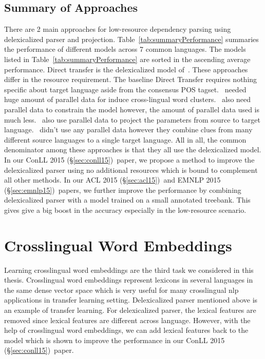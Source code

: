 \documentclass[12pt,twoside,final,hidelinks]{ltthesis}
\theoremstyle{definition}
\newcommand\conllv{ConLL 2015 (\S\ref{sec:conll15})}
\newcommand\aclv{ACL 2015 (\S\ref{sec:acl15})}
\newcommand\emnlpv{EMNLP 2015 (\S\ref{sec:emnlp15})}
\begin{document}
\subsection{Summary of Approaches}
There are 2 main approaches for low-resource dependency parsing using delexicalized parser and projection. Table~\ref{tab:summaryPerformance} summaries the performance of different models across 7 common languages. The models listed in Table~\ref{tab:summaryPerformance} are sorted in the ascending average performance. Direct transfer is the delexicalized model of~. These approaches differ in the resource requirement. The baseline Direct Transfer requires nothing specific about target language aside from the consensus POS tagset.~ needed huge amount of parallel data for induce cross-lingual word clusters.~ also need parallel data to constrain the model however, the amount of parallel data used is much less.~ also use parallel data to project the parameters from source to target language.~ didn't use any parallel data however they combine clues from many different source languages to a single target language. All in all, the common denominator among these approaches is that they all use the delexicalized model. In our \conllv\ paper, we propose a method to improve the delexicalized parser using no additional resources which is bound to complement all other methods. In our \aclv\ and \emnlpv\ papers, we further improve the performance by combining delexicalized parser with a model trained on a small annotated treebank. This gives give a big boost in the accuracy especially in the low-resource scenario. 


\section{Crosslingual Word Embeddings}
Learning crosslingual word embeddings are the third task we considered in this thesis. Crosslingual word embeddings represent lexicons in several languages in the same dense vector space which is very useful for many crosslingual nlp applications in transfer learning setting. Delexicalized parser mentioned above is an example of transfer learning. For delexicalized parser, the lexical features are removed since lexical features are different across language. However, with the help of crosslingual word embeddings, we can add lexical features back to the model which is shown to improve the performance in our \conllv\ paper. 
\end{document}
